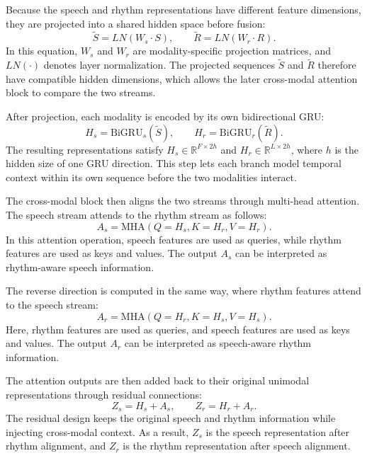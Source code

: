 \documentclass[12pt, a4paper, twocolumn]{article}
\begin{document}
Because the speech and rhythm representations have different feature dimensions,
they are projected into a shared hidden space before fusion:
\begin{equation}
\tilde{S} = LN(W_s \cdot S), \qquad
\tilde{R} = LN(W_r \cdot R).
\end{equation}
In this equation, \(W_s\) and \(W_r\) are modality-specific projection matrices,
and \(LN(\cdot)\) denotes layer normalization. The projected sequences
\(\tilde{S}\) and \(\tilde{R}\) therefore have compatible hidden dimensions,
which allows the later cross-modal attention block to compare the two streams.

After projection, each modality is encoded by its own bidirectional GRU:
\begin{equation}
H_s = \mathrm{BiGRU}_s(\tilde{S}), \qquad
H_r = \mathrm{BiGRU}_r(\tilde{R}).
\end{equation}
The resulting representations satisfy
\(H_s \in \mathbb{R}^{F \times 2h}\) and
\(H_r \in \mathbb{R}^{L \times 2h}\), where \(h\) is the hidden size of one GRU
direction. This step lets each branch model temporal context within its own
sequence before the two modalities interact.

The cross-modal block then aligns the two streams through multi-head attention.
The speech stream attends to the rhythm stream as follows:
\begin{equation}
A_s = \mathrm{MHA}(Q=H_s, K=H_r, V=H_r).
\end{equation}
In this attention operation, speech features are used as queries, while rhythm
features are used as keys and values. The output \(A_s\) can be interpreted as
rhythm-aware speech information.

The reverse direction is computed in the same way, where rhythm features attend
to the speech stream:
\begin{equation}
A_r = \mathrm{MHA}(Q=H_r, K=H_s, V=H_s).
\end{equation}
Here, rhythm features are used as queries, and speech features are used as keys
and values. The output \(A_r\) can be interpreted as speech-aware rhythm
information.

The attention outputs are then added back to their original unimodal
representations through residual connections:
\begin{equation}
Z_s = H_s + A_s, \qquad Z_r = H_r + A_r.
\end{equation}
The residual design keeps the original speech and rhythm information while
injecting cross-modal context. As a result, \(Z_s\) is the speech representation
after rhythm alignment, and \(Z_r\) is the rhythm representation after speech
alignment.
\end{document}
